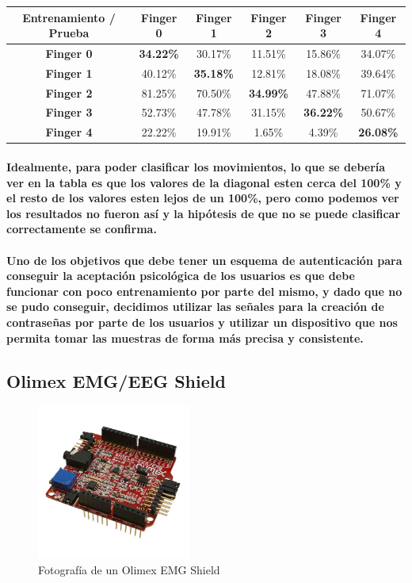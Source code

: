\documentclass{article}
\begin{document}
\begin{center}
\begin{tabular}{ |c|c|c|c|c|c| }
\hline
    \textbf{Entrenamiento / Prueba} & \textbf{Finger 0} & \textbf{Finger 1} & \textbf{Finger 2} & \textbf{Finger 3} & \textbf{Finger 4} \\
\hline
    \textbf{Finger 0} & \textbf{34.22\%} & 30.17\% & 11.51\% & 15.86\% & 34.07\% \\
\hline
    \textbf{Finger 1} & 40.12\% & \textbf{35.18\%} & 12.81\% & 18.08\% & 39.64\% \\
\hline
    \textbf{Finger 2} & 81.25\% & 70.50\% & \textbf{34.99\%} & 47.88\% & 71.07\% \\
\hline
    \textbf{Finger 3} & 52.73\% & 47.78\% & 31.15\% & \textbf{36.22\%} & 50.67\% \\
\hline
    \textbf{Finger 4} & 22.22\% & 19.91\% & 1.65\% & 4.39\% & \textbf{26.08\%} \\
\hline
\end{tabular}
\end{center}

\paragraph{
Idealmente, para poder clasificar los movimientos, lo que se debería ver en la tabla es que los valores de la diagonal esten cerca del 100\% y el resto de los valores esten lejos de un 100\%, pero como podemos ver los resultados no fueron así y la hipótesis de que no se puede clasificar correctamente se confirma.
}
\paragraph{
Uno de los objetivos que debe tener un esquema de autenticación para conseguir la aceptación psicológica de los usuarios es que debe funcionar con poco entrenamiento por parte del mismo, y dado que no se pudo conseguir, decidimos utilizar las señales para la creación de contraseñas por parte de los usuarios y utilizar un dispositivo que nos permita tomar las muestras de forma más precisa y consistente.
}

\subsection{Olimex EMG/EEG Shield}

\begin{figure}[ht]
    \centering
    \includegraphics[width=2in]{SHIELD-EKG-EMG.jpg}%
    \caption{Fotografía de un Olimex EMG Shield}
    \label{fig:olimexshield}
\end{figure}
\end{document}
